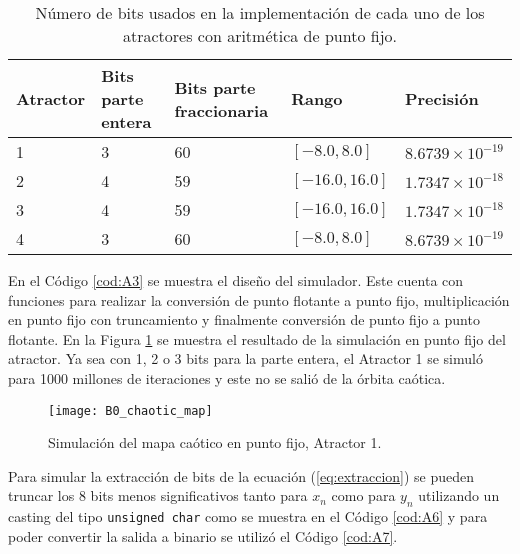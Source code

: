          \begin{table}[htbp]
            \centering
            \caption{Número de bits usados en la implementación de cada uno de los atractores con aritmética de punto fijo.}
            \begin{tabular}{|l|l|l|l|l|}
                \hline
                \rowcolor{lightgray} Atractor  & Bits parte entera & Bits parte fraccionaria & Rango  & Precisión\\
                \hline
                1     & 3                   & 60   & $[-8.0, 8.0]$   & $8.6739 \times 10^{-19}$\\
                \hline
                2     & 4                   & 59   & $[-16.0, 16.0]$ & $1.7347 \times 10^{-18}$\\
                \hline
                3     & 4                   & 59   & $[-16.0, 16.0]$ & $1.7347 \times 10^{-18}$\\
                \hline
                4     & 3                   & 60   & $[-8.0, 8.0]$   & $8.6739 \times 10^{-19}$\\
                \hline
            \end{tabular}
            \label{tab:bits_atractores}
        \end{table}

     En el Código \ref{cod:A3} se muestra el diseño del simulador. Este cuenta con funciones para realizar la conversión de punto flotante a punto fijo, multiplicación en punto fijo con truncamiento y finalmente conversión de punto fijo a punto flotante. En la Figura \ref{fig:B0_chaotic_map} se muestra el resultado de la simulación en punto fijo del atractor. Ya sea con 1, 2 o 3 bits para la parte entera, el Atractor 1 se simuló para 1000 millones de iteraciones y este no se salió de la órbita caótica.

        \begin{figure}[h!]
            \centering
            \texttt{[image: B0\_chaotic\_map]}
            \caption{Simulación del mapa caótico en punto fijo, Atractor 1.}
            \label{fig:B0_chaotic_map}
        \end{figure}

        Para simular la extracción de bits de la ecuación (\ref{eq:extraccion}) se pueden truncar los 8 bits menos significativos tanto para $x_{n}$ como para $y_{n}$ utilizando un casting del tipo \verb|unsigned char| como se muestra en el Código \ref{cod:A6} y para poder convertir la salida a binario se utilizó el Código \ref{cod:A7}.
        
